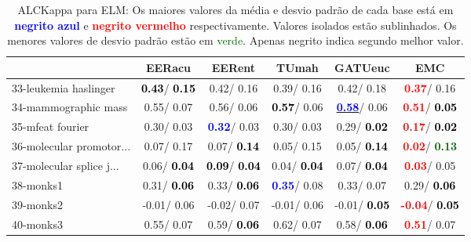\begin{table}[h]
\caption{ALCKappa para ELM: Os maiores valores da média e desvio padrão de cada base está em \textcolor{blue}{\textbf{negrito azul}} e \textcolor{red}{\textbf{negrito vermelho}} respectivamente. Valores isolados estão sublinhados. Os menores valores de desvio padrão estão em \textcolor{darkgreen}{verde}. Apenas negrito indica segundo melhor valor.}
\begin{center}\begin{tabular}{lc|c|c|c|c}
 & EERacu & EERent & TUmah & \textbf{GATUeuc} & EMC\\ \hline 33-leukemia haslinger & \textcolor{black}{\textbf{  0.43}}/\textcolor{black}{\textbf{  0.15}} &   0.42/  0.16 &   0.39/  0.16 &   0.42/  0.18 & \textcolor{red}{\textbf{  0.37}}/  0.16 \\
34-mammographic mass &   0.55/  0.07 &   0.56/  0.06 & \textcolor{black}{\textbf{  0.57}}/  0.06 & \underline{\textcolor{blue}{\textbf{  0.58}}}/  0.06 & \textcolor{red}{\textbf{  0.51}}/\textcolor{black}{\textbf{  0.05}} \\
35-mfeat fourier &   0.30/  0.03 & \textcolor{blue}{\textbf{  0.32}}/  0.03 &   0.30/  0.03 &   0.29/\textcolor{black}{\textbf{  0.02}} & \textcolor{red}{\textbf{  0.17}}/\textcolor{black}{\textbf{  0.02}} \\
36-molecular promotor... &   0.07/  0.17 &   0.07/\textcolor{black}{\textbf{  0.14}} &   0.05/  0.15 &   0.05/\textcolor{black}{\textbf{  0.14}} & \textcolor{red}{\textbf{  0.02}}/\textcolor{darkgreen}{\textbf{  0.13}} \\
37-molecular splice j... &   0.06/\textcolor{black}{\textbf{  0.04}} & \textcolor{black}{\textbf{  0.09}}/\textcolor{black}{\textbf{  0.04}} &   0.04/\textcolor{black}{\textbf{  0.04}} &   0.07/\textcolor{black}{\textbf{  0.04}} & \textcolor{red}{\textbf{  0.03}}/  0.05 \\
38-monks1 &   0.31/\textcolor{black}{\textbf{  0.06}} &   0.33/\textcolor{black}{\textbf{  0.06}} & \textcolor{blue}{\textbf{  0.35}}/  0.08 &   0.33/  0.07 &   0.29/\textcolor{black}{\textbf{  0.06}} \\
39-monks2 &  -0.01/  0.06 &  -0.02/  0.07 &  -0.01/  0.06 &  -0.01/\textcolor{black}{\textbf{  0.05}} & \textcolor{red}{\textbf{ -0.04}}/\textcolor{black}{\textbf{  0.05}} \\ \hline
40-monks3 &   0.55/  0.07 &   0.59/\textcolor{black}{\textbf{  0.06}} &   0.62/  0.07 &   0.58/\textcolor{black}{\textbf{  0.06}} & \textcolor{red}{\textbf{  0.51}}/  0.07 \\

\end{tabular}
\end{center}
\end{table}
